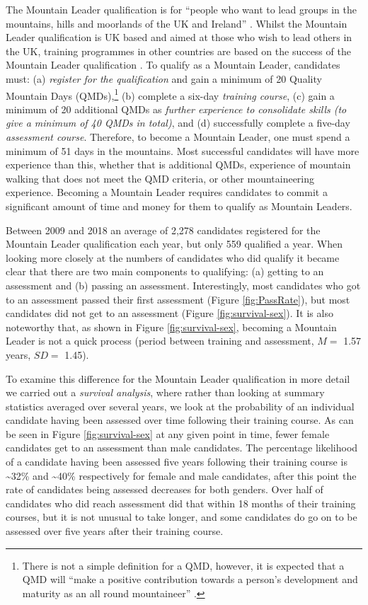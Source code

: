 \documentclass[
  12pt,
  a4paper,
]{book}
\begin{document}
The Mountain Leader qualification is for ``people who want to lead groups in the mountains, hills and moorlands of the UK and Ireland'' \citep[p 5]{MTUK2015a}. Whilst the Mountain Leader qualification is UK based and aimed at those who wish to lead others in the UK, training programmes in other countries are based on the success of the Mountain Leader qualification \citep{UIAA2015}. To qualify as a Mountain Leader, candidates must: (a) \emph{register for the qualification} and gain a minimum of 20 Quality Mountain Days (QMDs),\footnote{There is not a simple definition for a QMD, however, it is expected that a QMD will ``make a positive contribution towards a person's development and maturity as an all round mountaineer'' \citep{MountainTraining2019}.} (b) complete a six-day \emph{training course}, (c) gain a minimum of 20 additional QMDs as \emph{further experience to consolidate skills (to give a minimum of 40 QMDs in total)}, and (d) successfully complete a five-day \emph{assessment course}. Therefore, to become a Mountain Leader, one must spend a minimum of 51 days in the mountains. Most successful candidates will have more experience than this, whether that is additional QMDs, experience of mountain walking that does not meet the QMD criteria, or other mountaineering experience. Becoming a Mountain Leader requires candidates to commit a significant amount of time and money for them to qualify as Mountain Leaders.

Between 2009 and 2018 an average of 2,278 candidates registered for the Mountain Leader qualification each year, but only 559 qualified a year. When looking more closely at the numbers of candidates who did qualify it became clear that there are two main components to qualifying: (a) getting to an assessment and (b) passing an assessment. Interestingly, most candidates who got to an assessment passed their first assessment (Figure \ref{fig:PassRate}), but most candidates did not get to an assessment (Figure \ref{fig:survival-sex}). It is also noteworthy that, as shown in Figure \ref{fig:survival-sex}, becoming a Mountain Leader is not a quick process (period between training and assessment, \(M =\) 1.57 years, \(SD =\) 1.45).

To examine this difference for the Mountain Leader qualification in more detail we carried out a \emph{survival analysis}, where rather than looking at summary statistics averaged over several years, we look at the probability of an individual candidate having been assessed over time following their training course. As can be seen in Figure \ref{fig:survival-sex} at any given point in time, fewer female candidates get to an assessment than male candidates. The percentage likelihood of a candidate having been assessed five years following their training course is \textasciitilde32\% and \textasciitilde40\% respectively for female and male candidates, after this point the rate of candidates being assessed decreases for both genders. Over half of candidates who did reach assessment did that within 18 months of their training courses, but it is not unusual to take longer, and some candidates do go on to be assessed over five years after their training course.
\end{document}
